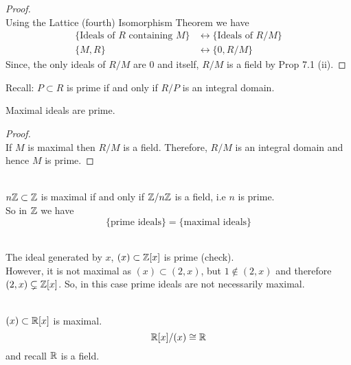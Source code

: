 \documentclass[../Main.tex]{subfiles}
\begin{document}
\begin{proof}~\\
	Using the Lattice (fourth) Isomorphism Theorem  we have
	\begin{align*}
	\{\text{Ideals of } R \text{ containing } M \} &\longleftrightarrow \{\text{Ideals of } R/M\}\\
	\{M,R\} &\longleftrightarrow \{0, R/M\}
	\end{align*}
	Since, the only ideals of $R/M$ are $0$ and itself, $R/M$ is a field by Prop 7.1 (ii).
\end{proof}
Recall: $P\subset R$ is prime if and only if $R/P$ is an integral domain.
\begin{crl}[title= Maximal ideals are prime]
	Maximal ideals are prime.
\end{crl}
\begin{proof}~\\
	If $M$ is maximal then $R/M$ is a field. Therefore, $R/M$ is an integral domain and hence $M$ is prime.
\end{proof}
\begin{example}~\\
	$n\mathbb{Z}\subset \mathbb{Z}$ is maximal if and only if $\mathbb{Z}/n\mathbb{Z}$ is a field, i.e $n$ is prime.\\
	So in $\mathbb{Z}$ we have
	\[\{\text{prime ideals}\} =\{\text{maximal ideals}\} \]
\end{example}
\begin{example}~\\
	The ideal generated by $x$, $(x) \subset \mathbb{Z}[x]$ is prime (check).\\
	However, it is not maximal as $(x) \subset (2,x)$, but $1\notin (2,x)$ and therefore $(2,x) \subsetneq \mathbb{Z}[x]$.
	So, in this case prime ideals are not necessarily maximal.
\end{example}
\begin{example}~\\
	$(x)\subset \mathbb{R}[x]$ is maximal.
	\[\mathbb{R}[x]/(x) \cong \mathbb{R}\]
	and recall $\mathbb{R}$ is a field.
\end{example}
\end{document}
